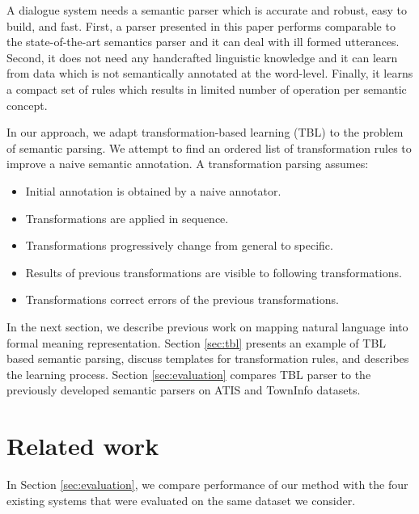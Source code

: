 \documentclass[11pt]{article}
\begin{document}
A dialogue system needs a semantic parser which is accurate and robust, easy to build, and fast. First, a parser presented in this paper performs comparable to the state-of-the-art semantics parser and it can deal with ill formed utterances. Second, it does not need any handcrafted linguistic knowledge and it can learn from data which is not semantically annotated at the word-level. Finally, it learns a compact set of rules which results in limited number of operation per semantic concept.


In our approach, we adapt transformation-based learning (TBL) \cite{brill95} to the problem of semantic parsing. We attempt to find an ordered list of transformation rules to improve a naive semantic annotation. A transformation parsing assumes:
\begin{itemize}
\item Initial annotation is obtained by a naive annotator.
\item Transformations are applied in sequence. 
\item Transformations progressively change from general to specific.
\item Results of previous transformations are visible to following transformations.
\item Transformations correct errors of the previous transformations.
\end{itemize} 

In the next section, we describe previous work on mapping natural language into formal meaning representation. Section \ref{sec:tbl} presents an example of TBL based semantic parsing, discuss templates for transformation rules, and describes the learning process. Section \ref{sec:evaluation} compares TBL parser to the previously developed semantic parsers on ATIS \cite{atis94} and TownInfo \cite{mairesse09} datasets.

\section{Related work}

In Section \ref{sec:evaluation}, we compare performance of our method with the four existing systems that were evaluated on the same dataset we consider. 
\end{document}
